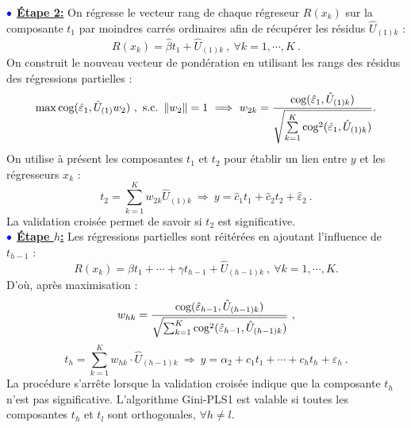 $\bulle$ \underline{\textbf{Étape 2:}}  On régresse le vecteur rang de chaque régreseur $R(x_k)$ sur la composante $t_1$ par moindres carrés ordinaires afin de récupérer les résidus $\hat{U}_{(1)k}$ : 
\[
R(x_k) = \hat{\beta}t_1 + \hat{U}_{(1)k} \ , \ \forall k = 1,\cdots, K \ .
\]
On construit le nouveau vecteur de pondération en utilisant les rangs des résidus des régressions partielles :
\[
\mathop{\mathrm{max}}\limits \text{cog}(\hat{\varepsilon}_1,\hat{U}_{(1)} w_2) \ , \ \text{s.c.} \ \left\|w_2\right\|=1 \ \Longrightarrow \ w_{2k} = \frac{\text{cog}(\hat{\varepsilon}_1,\hat{U}_{(1)k})}{\sqrt{\sum\limits_{k=1}^K \text{cog}^2(\hat{\varepsilon}_1,\hat{U}_{(1)k})}} .
\]
On utilise à présent les composantes $t_1$ et $t_2$ pour établir un lien entre $y$ et les régresseurs $x_k$ :
\[
t_2 = \sum\limits^K_{k=1} w_{2k} \hat{U}_{(1)k} \ \Longrightarrow \ y = \hat{c}_1 t_1 + \hat{c}_2 t_2 + \hat{\varepsilon}_2 \ .
\]
La validation croisée permet de savoir si $t_2$ est significative.\\

$\bulle$ \underline{\textbf{Étape $h$:}} Les régressions partielles sont réitérées en ajoutant l'influence de $t_{h-1}$ :
\[
R(x_k) = \beta t_1 + \cdots + \gamma t_{h-1} + \hat{U}_{(h-1)k} \ , \ \forall k = 1,\cdots, K.
\]
D'où, après maximisation :
\[
w_{hk} = \frac{\text{cog}(\hat{\varepsilon}_{h-1},\hat{U}_{(h-1)k})}{\sqrt{\sum_{k=1}^K \text{cog}^2(\hat{\varepsilon}_{h-1},\hat{U}_{(h-1)k})}} \ ,
\]
\[
t_h = \sum_{k=1}^K w_{hk}\cdot \hat{U}_{(h-1)k} \ \Longrightarrow \ y = \alpha_2 + c_1 t_1 + \cdots + c_h t_h + \varepsilon_h \ .
\]
La procédure s'arrête lorsque la validation croisée indique que la composante $t_h$ n'est pas significative. L'algorithme Gini-PLS1 est valable si toutes les composantes $t_h$ et $t_l$ sont orthogonales, $\forall h\neq l$. 

\medskip

